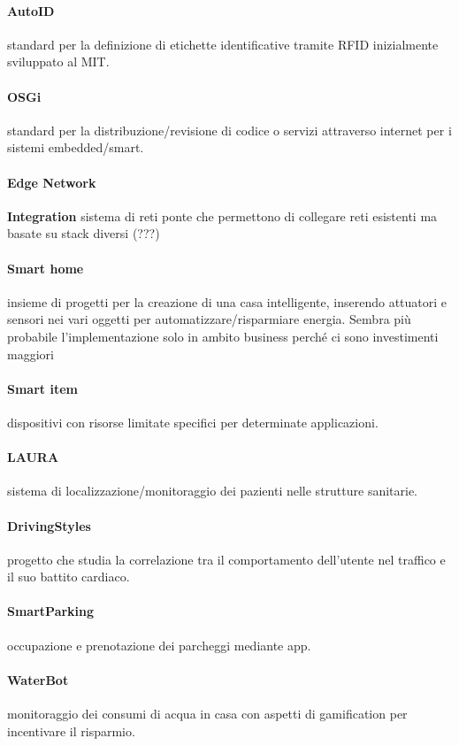\paragraph*{AutoID} standard per la definizione di etichette identificative
tramite RFID inizialmente sviluppato al MIT.

\paragraph*{OSGi} standard per la distribuzione/revisione di codice o
servizi attraverso internet per i sistemi embedded/smart.

\paragraph*{Edge Network} \textbf{Integration} sistema di reti ponte che
permettono di collegare reti esistenti ma basate su stack diversi (???)

\paragraph*{Smart home} insieme di progetti per la creazione di una casa
intelligente, inserendo attuatori e sensori nei vari oggetti per
automatizzare/risparmiare energia. Sembra più probabile
l'implementazione solo in ambito business perché ci sono investimenti
maggiori

\paragraph*{Smart item} dispositivi con risorse limitate specifici per
determinate applicazioni.

\paragraph*{LAURA} sistema di localizzazione/monitoraggio dei pazienti nelle
strutture sanitarie.

\paragraph*{DrivingStyles} progetto che studia la correlazione tra il
comportamento dell'utente nel traffico e il suo battito cardiaco.

\paragraph*{SmartParking} occupazione e prenotazione dei parcheggi mediante
app.

\paragraph*{WaterBot} monitoraggio dei consumi di acqua in casa con aspetti
di gamification per incentivare il risparmio.

